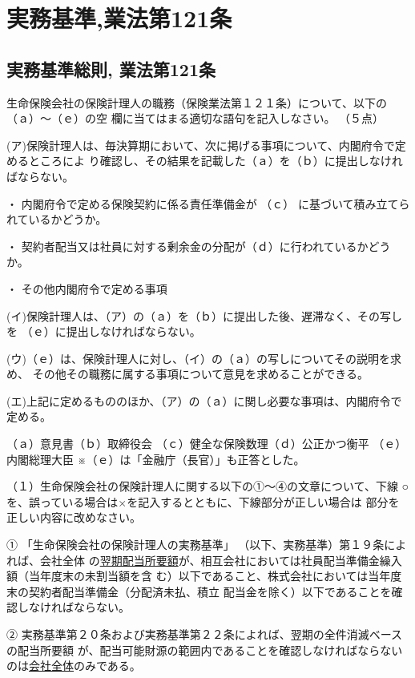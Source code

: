 \documentclass[report,gutter=10mm,fore-edge=10mm,uplatex,dvipdfmx]{jlreq}
\begin{document}
\chapter{実務基準,業法第121条}

\section{実務基準総則, 業法第121条}


生命保険会社の保険計理人の職務（保険業法第１２１条）について、以下の（ａ）～（ｅ）の空
欄に当てはまる適切な語句を記入しなさい。
（５点）

(ア)保険計理人は、毎決算期において、次に掲げる事項について、内閣府令で定めるところによ
り確認し、その結果を記載した（ａ）を（ｂ）に提出しなければならない。

・ 内閣府令で定める保険契約に係る責任準備金が （ｃ） に基づいて積み立てられているかどうか。

・ 契約者配当又は社員に対する剰余金の分配が（ｄ）に行われているかどうか。

・ その他内閣府令で定める事項

(イ)保険計理人は、（ア）の（ａ）を（ｂ）に提出した後、遅滞なく、その写しを
（ｅ）に提出しなければならない。

(ウ)（ｅ）は、保険計理人に対し、（イ）の（ａ）の写しについてその説明を求め、
その他その職務に属する事項について意見を求めることができる。

(エ)上記に定めるもののほか、（ア）の（ａ）に関し必要な事項は、内閣府令で定める。

\answer{}
（ａ）意見書（ｂ）取締役会
（ｃ）健全な保険数理（ｄ）公正かつ衡平
（ｅ）内閣総理大臣
※（ｅ）は「金融庁（長官）」も正答とした。

（１）生命保険会社の保険計理人に関する以下の①～④の文章について、下線
○を、誤っている場合は×を記入するとともに、下線部分が正しい場合は
部分を正しい内容に改めなさい。

① 「生命保険会社の保険計理人の実務基準」
（以下、実務基準）第１９条によれば、会社全体
の\underline{翌期配当所要額}が、相互会社においては社員配当準備金繰入額（当年度末の未割当額を含
む）以下であること、株式会社においては当年度末の契約者配当準備金（分配済未払、積立
配当金を除く）以下であることを確認しなければならない。

② 実務基準第２０条および実務基準第２２条によれば、翌期の全件消滅ベースの配当所要額
が、配当可能財源の範囲内であることを確認しなければならないのは\underline{会社全体}のみである。
\end{document}

